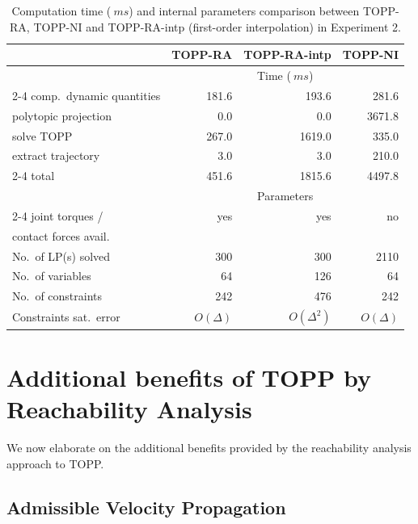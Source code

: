\documentclass[journal]{IEEEtran}
\theoremstyle{plain}
\theoremstyle{definition}
\theoremstyle{definition}
\begin{document}
\begin{table}[ht]
  \caption{Computation time ($\SI{}{ms}$) and internal parameters
    comparison between TOPP-RA, TOPP-NI and TOPP-RA-intp (first-order
    interpolation) in Experiment 2.}
\label{tab:computation-time-poly}
\centering
\begin{tabular}{lrrr}
  \toprule
  & TOPP-RA         &  TOPP-RA-intp  & TOPP-NI            	      \\
  \midrule
  & \multicolumn{3}{c}{Time ($\SI{}{ms}$)}\\
  \cmidrule{2-4}
  comp.\ dynamic quantities  &181.6  & 193.6   &281.6  \\
  polytopic projection      & 0.0   &    0.0  &3671.8 \\
  solve TOPP                & 267.0 & 1619.0  & 335.0 \\
  extract trajectory        &  3.0  &     3.0 &  210.0 \\
  \cmidrule{2-4}
  total                     & 451.6 &  1815.6 & 4497.8 \\
  \midrule
  & \multicolumn{3}{c}{Parameters}\\
  \cmidrule{2-4}
  joint torques /        &yes   &  yes  & no  \\
  contact forces avail.  &      &       &     \\
  No.\ of LP(s) solved    & 300  & 300   & 2110\\
  No.\ of variables       &64    & 126   & 64  \\
  No.\ of constraints     & 242  &  476  & 242 \\
  Constraints sat.\ error & $O(\Delta)$ & $O(\Delta^2)$ & $O(\Delta)$  \\
  \bottomrule
\end{tabular}
\end{table}


\section{Additional benefits of TOPP by Reachability Analysis}
\label{sec:optimal-path-policy}

We now elaborate on the additional benefits provided by the reachability
analysis approach to TOPP.

\subsection{Admissible Velocity Propagation}
\label{sec:avp}
\end{document}
